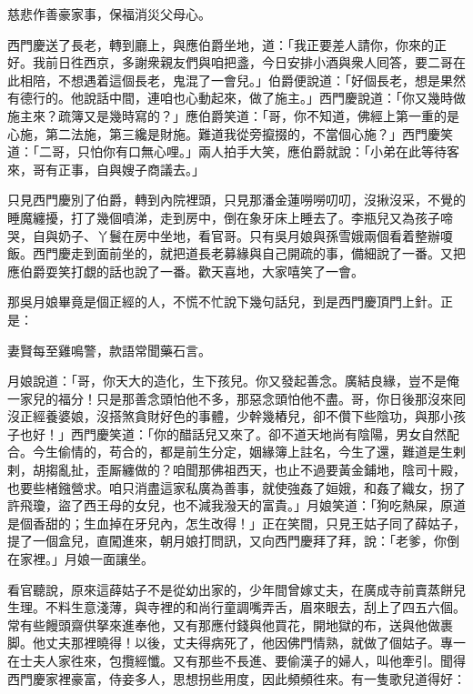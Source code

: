 慈悲作善豪家事，保福消災父母心。

西門慶送了長老，轉到廳上，與應伯爵坐地，道：「我正要差人請你，你來的正好。我前日徃西京，多謝衆親友們與咱把盞，今日安排小酒與衆人囘答，要二哥在此相陪，不想遇着這個長老，鬼混了一會兒。」伯爵便說道：「好個長老，想是果然有德行的。他說話中間，連咱也心動起來，做了施主。」西門慶說道：「你又幾時做施主來？疏簿又是幾時寫的？」{}應伯爵笑道：「哥，你不知道，佛經上第一重的是心施，第二法施，第三纔是財施。難道我從旁攛掇的，不當個心施？」{}西門慶笑道：「二哥，只怕你有口無心哩。」兩人拍手大笑，應伯爵就說：「小弟在此等待客來，哥有正事，自與嫂子商議去。」

只見西門慶別了伯爵，轉到內院裡頭，只見那潘金蓮嘮嘮叨叨，沒揪沒采，不覺的睡魔纏擾，打了幾個噴涕，走到房中，倒在象牙床上睡去了。李瓶兒又為孩子啼哭，自與奶子、丫鬟在房中坐地，看官哥。只有吳月娘與孫雪娥兩個看着整辦嗄飯。西門慶走到面前坐的，就把道長老募緣與自己開疏的事，備細說了一番。又把應伯爵耍笑打覷的話也說了一番。歡天喜地，大家嘻笑了一會。

那吳月娘畢竟是個正經的人，不慌不忙說下幾句話兒，到是西門慶頂門上針。正是：

妻賢每至雞鳴警，款語常聞藥石言。

月娘說道：「哥，你天大的造化，生下孩兒。你又發起善念。廣結良緣，豈不是俺一家兒的福分！只是那善念頭怕他不多，那惡念頭怕他不盡。{}哥，你日後那沒來囘沒正經養婆娘，沒搭煞貪財好色的事體，少幹幾樁兒，卻不儹下些陰功，與那小孩子也好！」西門慶笑道：「你的醋話兒又來了。卻不道天地尚有陰陽，男女自然配合。今生偷情的，苟合的，都是前生分定，姻緣簿上註名，今生了還，難道是生剌剌，胡搊亂扯，歪厮纏做的？{}咱聞那佛祖西天，也止不過要黃金鋪地，陰司十殿，也要些楮鏹營求。咱只消盡這家私廣為善事，就使強姦了姮娥，和姦了織女，拐了許飛瓊，盜了西王母的女兒，也不減我潑天的富貴。」{}月娘笑道：「狗吃熱屎，原道是個香甜的；生血掉在牙兒內，怎生改得！」{}正在笑間，只見王姑子同了薛姑子，提了一個盒兒，直闖進來，朝月娘打問訊，又向西門慶拜了拜，說：「老爹，你倒在家裡。」月娘一面讓坐。

看官聽說，原來這薛姑子不是從幼出家的，少年間曾嫁丈夫，在廣成寺前賣蒸餅兒生理。{}不料生意淺薄，與寺裡的和尚行童調嘴弄舌，眉來眼去，刮上了四五六個。常有些饅頭齋供拏來進奉他，又有那應付錢與他買花，開地獄的布，送與他做裹脚。{}他丈夫那裡曉得！以後，丈夫得病死了，他因佛門情熟，就做了個姑子。專一在士夫人家徃來，包攬經懺。又有那些不長進、要偷漢子的婦人，叫他牽引。聞得西門慶家裡豪富，侍妾多人，思想拐些用度，因此頻頻徃來。有一隻歌兒道得好：

